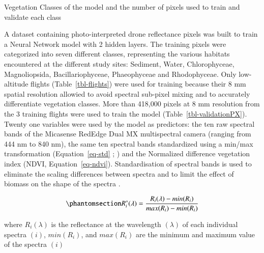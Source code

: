 \documentclass[
  number]{elsarticle}
\begin{document}
\begin{table}

\caption{\label{tbl-validationPX}Vegetation Classes of the model and the
number of pixels used to train and validate each class}


\end{table}%

A dataset containing photo-interpreted drone reflectance pixels was
built to train a Neural Network model with 2 hidden layers. The training
pixels were categorized into seven different classes, representing the
various habitats encountered at the different study sites: Sediment,
Water, Chlorophyceae, Magnoliopsida, Bacillariophyceae, Phaeophyceae and
Rhodophyceae. Only low-altitude flights (Table~\ref{tbl-flights}) were
used for training because their 8 mm spatial resolution allowied to
avoid spectral sub-pixel mixing and to accurately differentiate
vegetation classes. More than 418,000 pixels at 8 mm resolution from the
3 training flights were used to train the model
(Table~\ref{tbl-validationPX}). Twenty one variables were used by the
model as predictors: the ten raw spectral bands of the Micasense RedEdge
Dual MX multispectral camera (ranging from 444 nm to 840 nm), the same
ten spectral bands standardized using a min/max transformation
(Equation~\ref{eq-std} ; \citep{Cao2017}) and the Normalized difference
vegetation index (NDVI, Equation~\ref{eq-ndvi}). Standardisation of
spectral bands is used to eliminate the scaling differences between
spectra and to limit the effect of biomass on the shape of the spectra
\citetext{\citealp[ ]{Douay2022}; \citealp{Davies2023}}.

\begin{equation}\phantomsection\label{eq-std}{
R_{i}^{*}(\lambda) = \frac{R_{i}(\lambda) - min(R_{i})}{max(R_{i})- min(R_{i})}
}\end{equation}

where \(R_{i}(\lambda)\) is the reflectance at the wavelength
\((\lambda)\) of each individual spectra \((i)\), \(min(R_{i})\), and
\(max(R_{i})\) are the minimum and maximum value of the spectra \((i)\)
\end{document}

